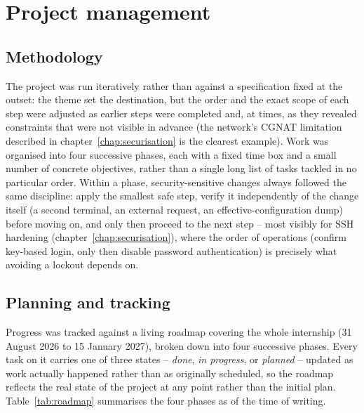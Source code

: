 \chapter{Project management}
\label{chap:gestion}

\section{Methodology}
The project was run iteratively rather than against a specification fixed at the outset: the theme set the destination, but the order and the exact scope of each step were adjusted as earlier steps were completed and, at times, as they revealed constraints that were not visible in advance (the network's CGNAT limitation described in chapter~\ref{chap:securisation} is the clearest example). Work was organised into four successive phases, each with a fixed time box and a small number of concrete objectives, rather than a single long list of tasks tackled in no particular order. Within a phase, security-sensitive changes always followed the same discipline: apply the smallest safe step, verify it independently of the change itself (a second terminal, an external request, an effective-configuration dump) before moving on, and only then proceed to the next step -- most visibly for SSH hardening (chapter~\ref{chap:securisation}), where the order of operations (confirm key-based login, only then disable password authentication) is precisely what avoiding a lockout depends on.

\section{Planning and tracking}
Progress was tracked against a living roadmap covering the whole internship (31 August 2026 to 15 January 2027), broken down into four successive phases. Every task on it carries one of three states -- \emph{done}, \emph{in progress}, or \emph{planned} -- updated as work actually happened rather than as originally scheduled, so the roadmap reflects the real state of the project at any point rather than the initial plan. Table~\ref{tab:roadmap} summarises the four phases as of the time of writing.

